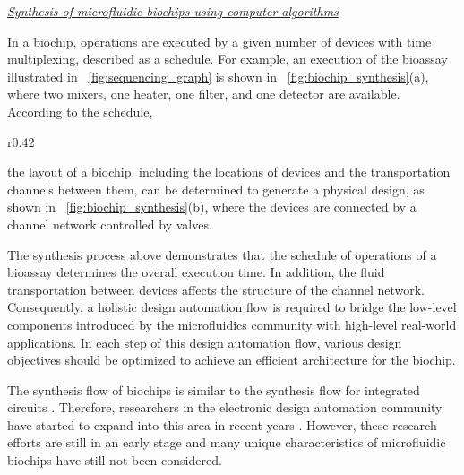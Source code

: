 \textit{\underline{Synthesis of microfluidic biochips  using
computer algorithms}}


In a biochip, 
operations are executed by a given number of devices with time
multiplexing,
described 
as
a schedule. For example, an execution %
of the bioassay
illustrated in \figname~\ref{fig:sequencing_graph} is shown 
in \figname~\ref{fig:biochip_synthesis}(a), 
where two mixers, one heater, one filter, and one detector are available.
According to the schedule, 
%
\begin{wrapfigure}[23]{r}{0.42\textwidth}
{
\vskip -3pt
\figurefontsize
\centering

\caption{Synthesis of microfluidic biochips.
(a) Scheduling. (b) Physical design.}
\label{fig:biochip_synthesis}
}
\end{wrapfigure}
%
the layout of a biochip, 
including the locations of devices and the transportation channels between them,
can be determined to generate a physical design, 
as shown in \figname~\ref{fig:biochip_synthesis}(b), where the devices
are connected by a channel network controlled by valves.

The synthesis process above demonstrates that the schedule of operations of a
bioassay determines the overall execution time. 
In addition, the fluid transportation between devices 
affects the structure of the channel network.
Consequently, a holistic design automation flow is required to bridge the
low-level components introduced by the microfluidics community with high-level
real-world applications. In each step of this design automation flow, various design
objectives should be optimized to achieve an efficient architecture for the
biochip.

The synthesis flow of biochips
is similar
to the synthesis flow for integrated circuits \cite{Micheli94}. Therefore,
researchers in the electronic design automation community have started to expand
into this area in recent years \cite{ChakrabartyFZ10,PopAC15}. 
However, these research efforts 
are still in an early stage and many unique characteristics of microfluidic
biochips have still not been considered. %

